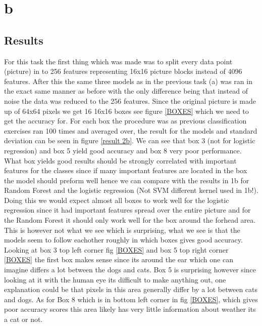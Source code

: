 \documentclass{article}
\begin{document}
\section{b}
\subsection{Results}
For this task the first thing which was made was to split every data point (picture) in to 256 features representing 16x16 picture blocks instead of 4096 features. After this the same three models as in the previous task (a) was ran in the exact same manner as before with the only difference being that instead of noise the data was reduced to the 256 features. Since the original picture is made up of 64x64 pixels we get 16 16x16 boxes see figure \ref{BOXES} which we need to get the accuracy for. For each box the procedure was as previous classification exercises ran 100 times and averaged over, the result for the models and standard deviation can be seen in figure \ref{result 2b}. We can see that box 3 (not for logistic regression) and box 5 yield good accuracy and box 8 very poor performance. What box yields good results should be strongly correlated with important features for the classes since if many important features are located in the box the model should preform well hence we can compare with the results in 1b for Random Forest and the logistic regression (Not SVM different kernel used in 1b!). Doing this we would expect almost all boxes to work well for the logistic regression since it had important features spread over the entire picture and for the Random Forest it should only work well for the box around the forhead area. This is however not what we see which is surprising, what we see is that the models seem to follow eachother roughly in which boxes gives good accuracy. Looking at box 3 top left corner fig \ref{BOXES} and box 5 top right corner \ref{BOXES} the first box makes sense since its around the ear which one can imagine differs a lot between the dogs and cats. Box 5  is surprising however since looking at it with the human eye its difficult to make anything out, one explanation could be that pixels in this area generally differ by a lot between cats and dogs. As for Box 8 which is in bottom left corner in fig \ref{BOXES}, which gives poor accuracy scores this area likely has very little information about weather its a cat or not.     
\end{document}
